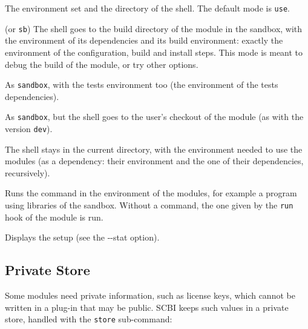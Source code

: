 \documentclass[a4paper,12pt,twoside]{article}
\newcommand{\code}[1]{\texttt{#1}}
\newcommand{\ddash}{-{}-}
\begin{document}
\begin{description}[font=\texttt]

	\item[\ddash{}mode:{[}dev|sandbox|sb|tests|use{]}] The environment set and the directory of the shell. The default mode is \code{use}.

	\begin{description}[font=\texttt]
		\item[sandbox] (or \code{sb}) The shell goes to the build directory of the module in the sandbox, with the environment of its dependencies and its build environment: exactly the environment of the configuration, build and install steps. This mode is meant to debug the build of the module, or try other options.

		\item[tests] As \code{sandbox}, with the tests environment too (the environment of the tests dependencies).

		\item[dev] As \code{sandbox}, but the shell goes to the user's checkout of the module (as with the version \code{dev}).

		\item[use] The shell stays in the current directory, with the environment needed to use the modules (as a dependency: their environment and the one of their dependencies, recursively).
	\end{description}

	\item[\ddash{}run{[}="command args..."{]}] \label{cmd!run}Runs the command in the environment of the modules, for example a program using libraries of the sandbox. Without a command, the one given by the \code{run} hook of the module is run.

	\item[\ddash{}stat] Displays the setup (see the \ddash{}stat option).
\end{description}

\subsection{Private Store}
\label{private store}
\label{store}

Some modules need private information, such as license keys, which cannot be written in a plug-in that may be public. SCBI keeps such values in a private store, handled with the \code{store} sub-command:
\end{document}
